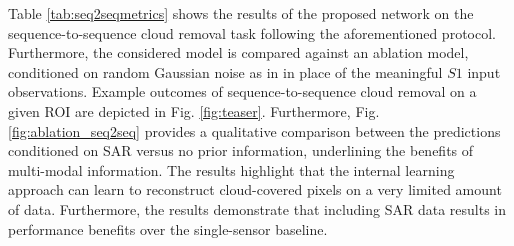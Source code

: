 \documentclass[journal]{IEEEtran}
\begin{document}
Table \ref{tab:seq2seqmetrics} shows the results of the proposed network on the sequence-to-sequence cloud removal task following the aforementioned protocol. Furthermore, the considered model is compared against an ablation model, conditioned on random Gaussian noise as in \cite{ulyanov2018deep, zhang2019internal} in place of the meaningful $S1$ input observations. Example outcomes of sequence-to-sequence cloud removal on a given ROI are depicted in Fig. \ref{fig:teaser}. Furthermore, Fig. \ref{fig:ablation_seq2seq} provides a qualitative comparison between the predictions conditioned on SAR versus no prior information, underlining the benefits of multi-modal information. The results highlight that the internal learning approach can learn to reconstruct cloud-covered pixels on a very limited amount of data. Furthermore, the results demonstrate that including SAR data results in performance benefits over the single-sensor baseline.
\end{document}
